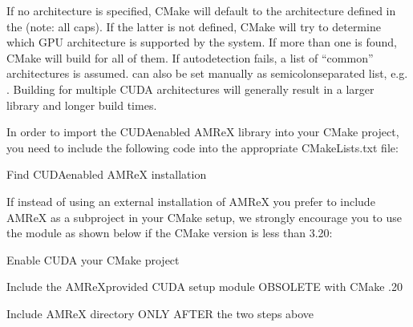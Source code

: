 \documentclass[letterpaper,10pt,english]{sphinxmanual}
\begin{document}
\begin{sphinxVerbatim}[commandchars=\\\{\}]
\end{sphinxVerbatim}

\sphinxAtStartPar
If no architecture is specified, CMake will default to the architecture defined in the
  (note: all caps).
If the latter is not defined, CMake will try to determine which GPU architecture is supported by the system.
If more than one is found, CMake will build for all of them.
If autodetection fails, a list of “common” architectures is assumed.
 can also be set manually as semicolon\sphinxhyphen{}separated list, e.g. .
Building for multiple CUDA architectures will generally result in a larger library and longer build times.

\sphinxAtStartPar
{}

\sphinxAtStartPar
In order to import the CUDA\sphinxhyphen{}enabled AMReX library into your CMake project, you need to include
the following code into the appropriate CMakeLists.txt file:

\begin{sphinxVerbatim}[commandchars=\\\{\}]
Find CUDA\PYGZhy{}enabled AMReX installation
\end{sphinxVerbatim}

\sphinxAtStartPar
If instead of using an external installation of AMReX you prefer to include AMReX as a subproject
in your CMake setup, we strongly encourage you to use the  module as shown below
if the CMake version is less than 3.20:

\begin{sphinxVerbatim}[commandchars=\\\{\}]
Enable CUDA  your CMake project

Include the AMReX\PYGZhy{}provided CUDA setup module \PYGZhy{}\PYGZhy{} OBSOLETE with CMake \PYGZgt{} .20

Include AMReX  directory ONLY AFTER the two steps above
\end{sphinxVerbatim}
\end{document}
